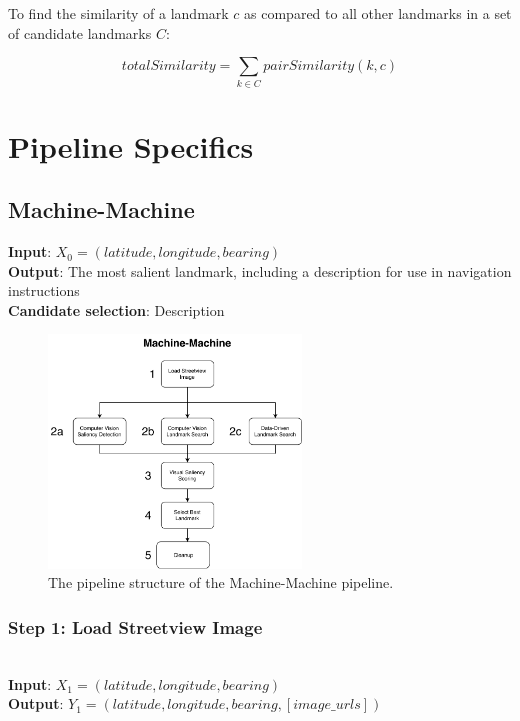 To find the similarity of a landmark $c$ as compared to all other landmarks in a set of candidate landmarks $C$:

\begin{equation}\label{eq:landmrkSimilarityOverall}
    totalSimilarity = \sum\limits_{k \in C} pairSimilarity(k, c)
\end{equation}

\section{Pipeline Specifics}
\subsection{Machine-Machine}

\noindent \textbf{Input}: $X_0 = (latitude, longitude, bearing)$\\
\textbf{Output}: The most salient landmark, including a description for use in navigation instructions\\
\textbf{Candidate selection}: Description

\begin{figure}[htbp]
  \centering
  \includegraphics[width=0.6\textwidth]{pipeline_diagrams/machine-machine.pdf}
  \caption{The pipeline structure of the Machine-Machine pipeline.}
  \label{fig:pipeline:mm}
\end{figure}

\subsubsection*{Step 1: Load Streetview Image}~\\
\noindent \textbf{Input}: $X_1 = (latitude, longitude, bearing)$\\
\textbf{Output}: $Y_1 = (latitude, longitude, bearing, [image\_urls])$

